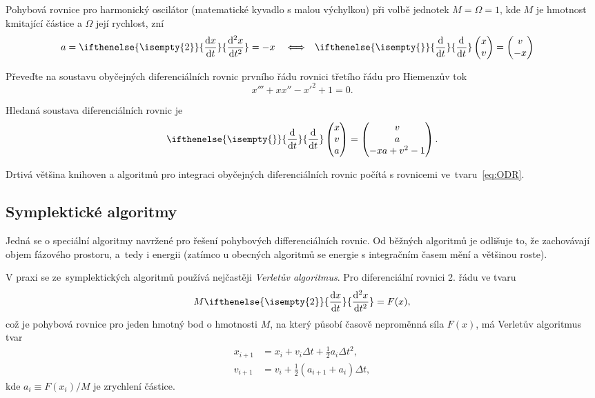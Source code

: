 \documentclass[a4paper,11pt,twoside]{article}
\renewcommand{\d}{\mathrm{d}}           %
\newcommand{\derivative}[3][]{\ifthenelse{\isempty{#1}}	    %
	{\frac{\d{#2}}{\d{#3}}}
	{\frac{\d^{#1}{#2}}{\d{#3}^{#1}}}
}
\def\makematrix#1{\begin{pmatrix}#1\end{pmatrix}}
\theoremstyle{red}
\theoremstyle{green}
\begin{document}
    \begin{example}
    Pohybová rovnice pro harmonický oscilátor (matematické kyvadlo s malou výchylkou) při volbě jednotek $M=\Omega=1$, kde $M$ je hmotnost kmitající částice a $\Omega$ její rychlost, zní
    \begin{align}
        a&=\derivative[2]{x}{t}=-x &&\Longleftrightarrow &
        \derivative{}{t}\makematrix{x \\ v}&=\makematrix{v \\ -x}
    \end{align}

    \end{example}

    \begin{solved}
    Převeďte na soustavu obyčejných diferenciálních rovnic prvního řádu rovnici třetího řádu pro Hiemenzův tok
    \begin{equation}
        x'''+xx''-x'^{2}+1=0.
    \end{equation}
    \end{solved}

    \begin{solution}
    Hledaná soustava diferenciálních rovnic je
    \begin{equation}
        \derivative{}{t}\makematrix{x \\ v \\ a}=\makematrix{v \\ a \\ -xa+v^{2}-1}.
    \end{equation}
    \end{solution}

    Drtivá většina knihoven a algoritmů pro integraci obyčejných diferenciálních rovnic počítá s rovnicemi ve~tvaru~\eqref{eq:ODR}.

\subsection{Symplektické algoritmy}
    Jedná se o speciální algoritmy navržené pro řešení pohybových differenciálních rovnic.
    Od běžných algoritmů je odlišuje to, že zachovávají objem fázového prostoru, a~tedy i energii (zatímco u obecných algoritmů se energie s integračním časem mění a většinou roste).
    
    V praxi se ze~symplektických algoritmů používá nejčastěji \emph{Verletův algoritmus}.
    Pro diferenciální rovnici 2. řádu ve tvaru 
    \begin{equation}\label{eq:EM}
        M\derivative[2]{x}{t}=F(x),
    \end{equation}
    což je pohybová rovnice pro jeden hmotný bod o hmotnosti $M$, na který působí časově neproměnná síla $F(x)$, má Verletův algoritmus tvar
    \begin{align}
        x_{i+1}&=x_{i}+v_{i}\Delta t+\frac{1}{2}a_{i}\Delta t^{2},\nonumber\\
        v_{i+1}&=v_{i}+\frac{1}{2}\left(a_{i+1}+a_{i}\right)\Delta t,
        \label{eq:Verlet}
    \end{align}
    kde $a_{i}\equiv F(x_{i})/M$ je zrychlení částice.
\end{document}
